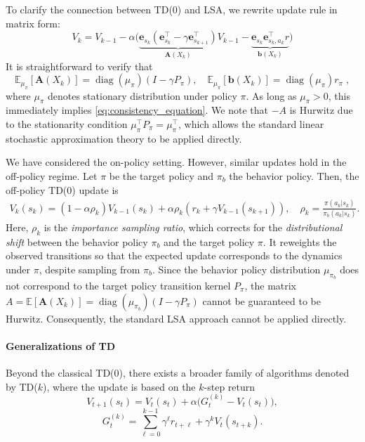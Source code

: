 \documentclass{article}
\numberwithin{equation}{section}
\newcommand{\E}{\mathbb E}
\newcommand{\bA}{\mathbf{A}}
\newcommand{\bb}{\mathbf{b}}
\newcommand{\be}{\mathbf{e}}
\newcommand{\eqsp}{\;}
\begin{document}
To clarify the connection between TD(0) and LSA, we rewrite update rule in matrix form:
\begin{equation}
    V_{k} = V_{k-1} - \alpha\bigg(\underbrace{\be_{s_k}(\be_{s_k}^\top - \gamma\be_{s_{k+1}}^\top)}_{\bA(X_k)}V_{k-1} - \underbrace{\be_{s_k}\be_{s_k,a_k}^\top r}_{\bb({X_k})}\bigg)
\end{equation}
It is straightforward to verify that
\[\E_{\mu_{\pi}}[\bA(X_k)] = \operatorname{diag}(\mu_{\pi})(I - \gamma P_\pi), \quad \E_{\mu_\pi}[\bb(X_k)] =\operatorname{diag}(\mu_\pi) r_\pi\eqsp,\]
where \(\mu_\pi\) denotes stationary distribution under policy \(\pi\). As long as \(\mu_\pi > 0 \), this immediately implies  \eqref{eq:consistency_equation}. We note that $-A$ is Hurwitz due to the stationarity condition $\mu_\pi^\top P_\pi = \mu_\pi^\top$, which allows the standard linear stochastic approximation theory to be applied directly.


We have considered the on-policy setting. However, similar updates hold in the off-policy regime. Let \(\pi\) be the target policy and \(\pi_b\) the behavior policy. Then, the off-policy TD(0) update is 
\begin{align}
\label{eq:importance}
V_k(s_k) = {(1-\alpha\rho_k)}V_{k-1}(s_k) + \alpha \rho_k(r_k + \gamma V_{k-1}(s_{k+1})), \quad \rho_k = \frac{\pi(a_k|s_k)}{\pi_b(a_k|s_k)}.
\end{align}
Here, $\rho_k$ is the \emph{importance sampling ratio}, which corrects for the \emph{distributional shift} between the behavior policy $\pi_b$ and the target policy $\pi$. It reweights the observed transitions so that the expected update corresponds to the dynamics under $\pi$, despite sampling from $\pi_b$. Since the behavior policy distribution $\mu_{\pi_b}$ does not correspond to the target policy transition kernel $P_\pi$, the matrix $A = \E[\bA(X_k)] = \operatorname{diag}(\mu_{\pi_b})(I-\gamma P_\pi)$ cannot be guaranteed to be Hurwitz. Consequently, the standard LSA approach cannot be applied directly.

\paragraph{Generalizations of TD}
\normalfont\selectfont 
Beyond the classical TD(0), there exists a broader family of algorithms denoted by TD(\(k\)), where the update is based on the \(k\)-step return
\[
    V_{t+1}(s_t) = V_t(s_t) + \alpha \big( G_t^{(k)} - V_t(s_t) \big),
\]
\[
    G_t^{(k)} = \sum_{\ell=0}^{k-1} \gamma^\ell r_{t+\ell} + \gamma^k V_t(s_{t+k}) .
\]
\end{document}
